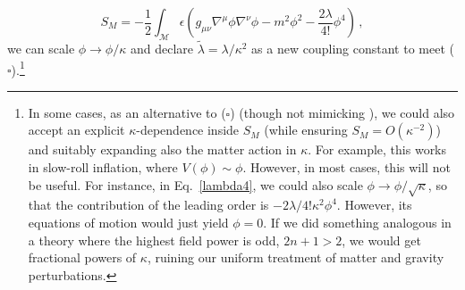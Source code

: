 \documentclass[]{jkpaper}
\theoremstyle{plain}
\theoremstyle{definition}
\begin{document}
\begin{equation} \label{lambda4}
S_M=-\frac{1}{2}\int_\mathcal{M}\epsilon\left(g_{\mu\nu}\nabla^\mu\phi\nabla^\nu\phi-m^2\phi^2-\frac{2\lambda}{4!}\phi^4\right)\,,
\end{equation}
we can scale $\phi\to\phi/\kappa$ and declare $\tilde\lambda=\lambda/\kappa^2$ as a new coupling constant to meet ({\color{red}$\square$}).\footnote{In some cases, as an alternative to ({\color{red}$\square$}) (though not mimicking \cite{Arms1,Arms:1979au,Arms:1982ea,Saraykar:1981qm,Saraykar2,Arms:1986vk,Altas:2021htf}), we could also accept an explicit $\kappa$-dependence inside $S_M$ (while ensuring $S_M=O(\kappa^{-2})$) and suitably expanding also the matter action in $\kappa$. For example, this works in slow-roll inflation, where $V(\phi)\sim\phi$. However, in most cases, this will not be useful. For instance, in Eq.~\eqref{lambda4}, we could also scale $\phi\to\phi/\sqrt{\kappa}$, so that the contribution of the leading order is $-2\lambda/4!\kappa^2\phi^4$. However, its equations of motion would just yield $\phi=0$. If we did something analogous in a theory where the highest field power is odd, $2n+1>2$, we would get fractional powers of $\kappa$, ruining our uniform treatment of matter and gravity perturbations.} 
\end{document}
